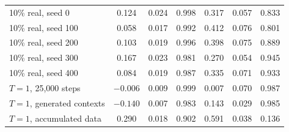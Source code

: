 \documentclass[10pt,letterpaper]{article}
\begin{document}
\begin{table}[H]
\begin{tabular}{@{}lcccccc@{}}
\midrule
10\% real, seed 0 & 0.124 & 0.024 & 0.998 & 0.317 & 0.057 & 0.833 \\
10\% real, seed 100 & 0.058 & 0.017 & 0.992 & 0.412 & 0.076 & 0.801 \\
10\% real, seed 200 & 0.103 & 0.019 & 0.996 & 0.398 & 0.075 & 0.889 \\
10\% real, seed 300 & 0.167 & 0.023 & 0.981 & 0.270 & 0.054 & 0.945 \\
10\% real, seed 400 & 0.084 & 0.019 & 0.987 & 0.335 & 0.071 & 0.933 \\
\midrule
$T{=}1$, 25{,}000 steps & $-0.006$ & 0.009 & 0.999 & 0.007 & 0.070 & 0.987 \\
$T{=}1$, generated contexts & $-0.140$ & 0.007 & 0.983 & 0.143 & 0.029 & 0.985 \\
$T{=}1$, accumulated data & 0.290 & 0.018 & 0.902 & 0.591 & 0.038 & 0.136 \\
\bottomrule
\end{tabular}
\label{tab:fit}
\end{table}
\end{document}
